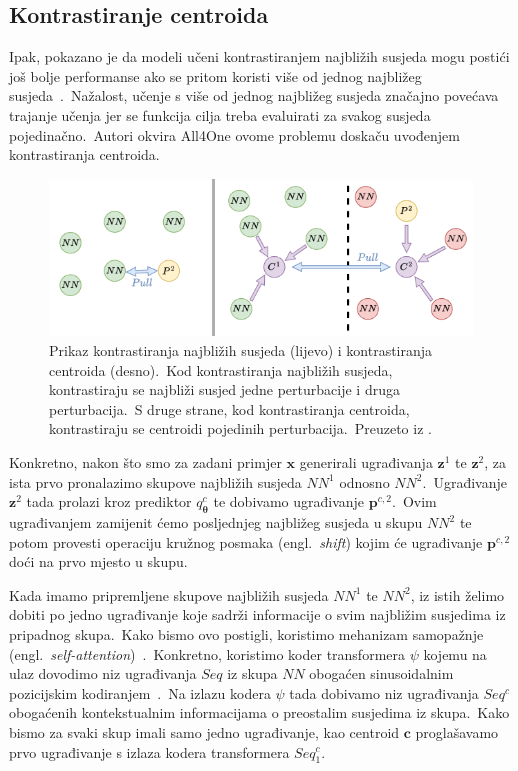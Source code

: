 \documentclass[diplomskirad]{fer}
\begin{document}
\pagebreak

\subsection{Kontrastiranje centroida}
\label{sub:centroidi}
  
Ipak, pokazano je da modeli učeni kontrastiranjem najbližih susjeda mogu postići još bolje performanse ako se pritom koristi više od jednog najbližeg susjeda~\cite{koohpayegani2021mean}.\ 
Nažalost, učenje s više od jednog najbližeg susjeda značajno povećava trajanje učenja jer se funkcija cilja treba evaluirati za svakog susjeda pojedinačno.\ 
Autori okvira All4One ovome problemu doskaču uvođenjem kontrastiranja centroida.\ 

\begin{figure}[h]
  \centering
  \includegraphics[scale=1]{./Slike/neighbour_vs_centroid.png}
  \caption{Prikaz kontrastiranja najbližih susjeda (lijevo) i kontrastiranja centroida (desno).\ Kod kontrastiranja najbližih susjeda, kontrastiraju se najbliži susjed jedne perturbacije i druga perturbacija.\ S druge strane, kod kontrastiranja centroida, kontrastiraju se centroidi pojedinih perturbacija.\ Preuzeto iz \cite{estepa2023all4one}.}
  \label{fig:neighbour_vs_centroid}
\end{figure}

Konkretno, nakon što smo za zadani primjer $\bm{x}$ generirali ugrađivanja $\bm{z}^1$ te $\bm{z}^2$, za ista prvo pronalazimo skupove najbližih susjeda $NN^1$ odnosno $NN^2$.\ 
Ugrađivanje $\bm{z}^2$ tada prolazi kroz prediktor $q_{\bm{\theta}}^{c}$ te dobivamo ugrađivanje $\bm{p}^{c, 2}$.\ Ovim ugrađivanjem zamijenit ćemo posljednjeg najbližeg susjeda u skupu $NN^2$ te potom provesti operaciju kružnog posmaka (engl.\ \textit{shift}) kojim će ugrađivanje $\bm{p}^{c, 2}$ doći na prvo mjesto u skupu.\ 
  
Kada imamo pripremljene skupove najbližih susjeda $NN^1$ te $NN^2$, iz istih želimo dobiti po jedno ugrađivanje koje sadrži informacije o svim najbližim susjedima iz pripadnog skupa.\ 
Kako bismo ovo postigli, koristimo mehanizam samopažnje (engl.\ \textit{self-attention})~\cite{vaswani2017attention}.\
Konkretno, koristimo koder transformera $\psi$ kojemu na ulaz dovodimo niz ugrađivanja $Seq$ iz skupa $NN$ obogaćen sinusoidalnim pozicijskim kodiranjem~\cite{vaswani2017attention}.\ 
Na izlazu kodera $\psi$ tada dobivamo niz ugrađivanja $Seq^c$ obogaćenih kontekstualnim informacijama o preostalim susjedima iz skupa.\ Kako bismo za svaki skup imali samo jedno ugrađivanje, kao centroid $\bm{c}$ proglašavamo prvo ugrađivanje s izlaza kodera transformera $Seq_1^c$.\ 
\end{document}

